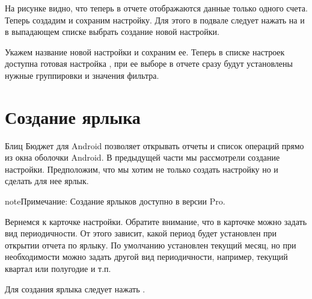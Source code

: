 \documentclass[a4paper,10pt,russian]{sphinxmanual}
\begin{document}
\noindent{}
\noindent{}
\noindent{}

На рисунке видно, что теперь в отчете отображаются данные только одного счета. Теперь создадим и
сохраним настройку. Для этого в подвале следует нажать на  и в выпадающем списке
выбрать создание новой настройки.

\noindent{}
\noindent{}
\noindent{}

Укажем название новой настройки  и сохраним ее. Теперь в списке настроек доступна
готовая настройка , при ее выборе в отчете сразу будут установлены нужные группировки
и значения фильтра.

\noindent{}
\noindent{}


\section{Создание ярлыка}
\label{\detokenize{shortcuts:id3}}
Блиц Бюджет для Android позволяет открывать отчеты и список операций прямо из окна оболочки Android. В предыдущей части мы рассмотрели
создание настройки. Предположим, что мы хотим не только создать настройку но и сделать для нее ярлык.

\begin{sphinxadmonition}{note}{Примечание:}
Создание ярлыков доступно в версии Pro.
\end{sphinxadmonition}

Вернемся к карточке настройки. Обратите внимание, что в карточке можно задать вид периодичности. От этого зависит,
какой период будет установлен при открытии отчета по ярлыку. По умолчанию установлен текущий месяц, но при
необходимости можно задать другой вид периодичности, например, текущий квартал или полугодие и т.п.

Для создания ярлыка следует нажать .
\end{document}
